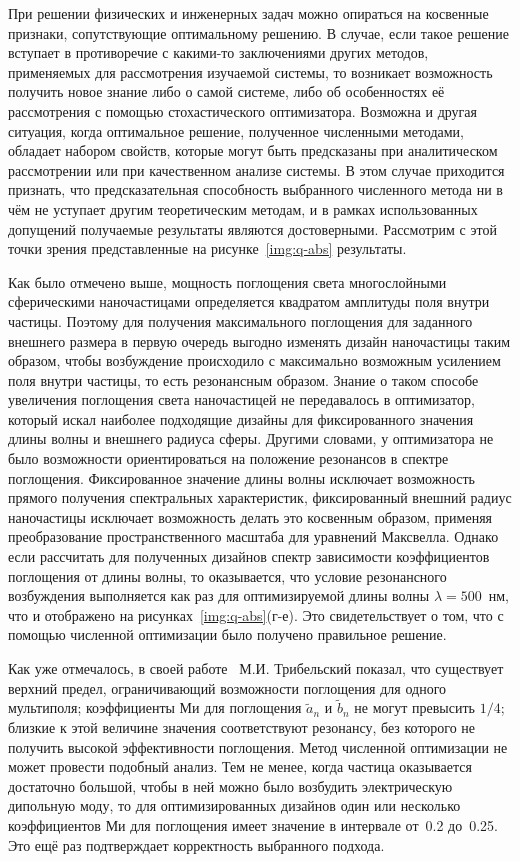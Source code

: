 При решении физических и инженерных задач можно опираться на косвенные
признаки, сопутствующие оптимальному решению.  В случае, если такое
решение вступает в противоречие с какими-то заключениями других
методов, применяемых для рассмотрения изучаемой системы, то возникает
возможность получить новое знание либо о самой системе, либо об
особенностях её рассмотрения с помощью стохастического
оптимизатора. Возможна и другая ситуация, когда оптимальное решение,
полученное численными методами, обладает набором свойств, которые
могут быть предсказаны при аналитическом рассмотрении или при
качественном анализе системы. В этом случае приходится признать, что
предсказательная способность выбранного численного метода ни в чём не
уступает другим теоретическим методам, и в рамках использованных
допущений получаемые результаты являются достоверными. Рассмотрим с
этой точки зрения представленные на рисунке~\ref{img:q-abs}
результаты.

Как было отмечено выше, мощность поглощения света многослойными
сферическими наночастицами определяется квадратом амплитуды поля
внутри частицы.  Поэтому для получения максимального поглощения для
заданного внешнего размера в первую очередь выгодно изменять дизайн
наночастицы таким образом, чтобы возбуждение происходило с максимально
возможным усилением поля внутри частицы, то есть резонансным образом.
Знание о таком способе увеличения поглощения света наночастицей не
передавалось в оптимизатор, который искал наиболее подходящие дизайны
для фиксированного значения длины волны и внешнего радиуса сферы.
Другими словами, у оптимизатора не было возможности ориентироваться на
положение резонансов в спектре поглощения. Фиксированное значение длины
волны исключает возможность прямого получения спектральных
характеристик, фиксированный внешний радиус наночастицы исключает
возможность делать это косвенным образом, применяя преобразование
пространственного масштаба для уравнений Максвелла. Однако если
рассчитать для полученных дизайнов спектр зависимости коэффициентов
поглощения от длины волны, то оказывается, что условие резонансного
возбуждения выполняется как раз для оптимизируемой длины волны
$\lambda=500$~нм, что и отображено на рисунках~\ref{img:q-abs}(г-е).  Это
свидетельствует о том, что с помощью численной оптимизации было
получено правильное решение.

Как уже отмечалось, в своей работе~\cite{Tribelsky-2011}
М.И. Трибельский показал, что существует верхний предел, ограничивающий
возможности поглощения для одного мультиполя; коэффициенты Ми для
поглощения $\tilde{a}_n$ и $\tilde{b}_n$ не могут превысить $1/4$;
близкие к этой величине значения соответствуют резонансу, без которого
не получить высокой эффективности поглощения.  Метод численной
оптимизации не может провести подобный анализ.  Тем не менее, когда
частица оказывается достаточно большой, чтобы в ней можно было
возбудить электрическую дипольную моду, то для оптимизированных
дизайнов один или несколько коэффициентов Ми для поглощения имеет
значение в интервале от~0.2 до~0.25.  Это ещё раз подтверждает
корректность выбранного подхода.

